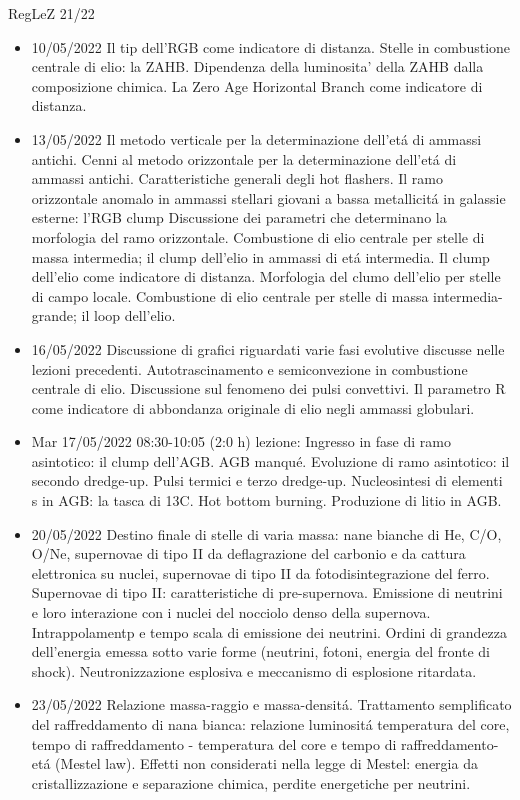 \begin{frame}[allowframebreaks]{RegLeZ 21/22}
\begin{itemize}
\item 10/05/2022 Il tip dell'RGB come indicatore di distanza. Stelle in combustione centrale di elio: la ZAHB. Dipendenza della luminosita' della ZAHB dalla composizione chimica. La Zero Age Horizontal Branch come indicatore di distanza.
\item 13/05/2022 Il metodo verticale per la determinazione dell'et\'a di ammassi antichi. Cenni al metodo orizzontale per la determinazione dell'et\'a di ammassi antichi. Caratteristiche generali degli hot flashers. Il ramo orizzontale anomalo in ammassi stellari giovani a bassa metallicit\'a in galassie esterne: l'RGB clump Discussione dei parametri che determinano la morfologia del ramo orizzontale. Combustione di elio centrale per stelle di massa intermedia; il clump dell'elio in ammassi di et\'a intermedia. Il clump dell'elio come indicatore di distanza. Morfologia del clumo dell'elio per stelle di campo locale. Combustione di elio centrale per stelle di massa intermedia-grande; il loop dell'elio.
\item 16/05/2022 Discussione di grafici riguardati varie fasi evolutive discusse nelle lezioni precedenti. Autotrascinamento e semiconvezione in combustione centrale di elio. Discussione sul fenomeno dei pulsi convettivi. Il parametro R come indicatore di abbondanza originale di elio negli ammassi globulari.
\item Mar 17/05/2022 08:30-10:05 (2:0 h) lezione: Ingresso in fase di ramo asintotico: il clump dell'AGB. AGB manqu\'e. Evoluzione di ramo asintotico: il secondo dredge-up. Pulsi termici e terzo dredge-up. Nucleosintesi di elementi s in AGB: la tasca di 13C. Hot bottom burning. Produzione di litio in AGB.
\item 20/05/2022 Destino finale di stelle di varia massa: nane bianche di He, C/O, O/Ne, supernovae di tipo II da deflagrazione del carbonio e da cattura elettronica su nuclei, supernovae di tipo II da fotodisintegrazione del ferro. Supernovae di tipo II: caratteristiche di pre-supernova. Emissione di neutrini e loro interazione con i nuclei del nocciolo denso della supernova. Intrappolamentp e tempo scala di emissione dei neutrini. Ordini di grandezza dell'energia emessa sotto varie forme (neutrini, fotoni, energia del fronte di shock). Neutronizzazione esplosiva e meccanismo di esplosione ritardata.
\item 23/05/2022 Relazione massa-raggio e massa-densit\'a. Trattamento semplificato del raffreddamento di nana bianca: relazione luminosit\'a temperatura del core, tempo di raffreddamento - temperatura del core e tempo di raffreddamento-et\'a (Mestel law). Effetti non considerati nella legge di Mestel: energia da cristallizzazione e separazione chimica, perdite energetiche per neutrini.
\end{itemize}
\end{frame}

